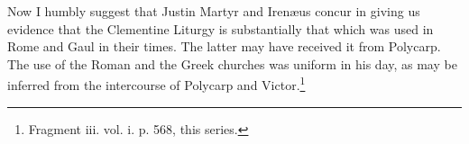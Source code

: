 Now I humbly suggest that Justin Martyr and Irenæus concur in giving us evidence that the Clementine Liturgy is substantially that which was used in Rome and Gaul in their times. The latter may have received it from Polycarp. The use of the Roman and the Greek churches was uniform in his day, as may be inferred from the intercourse of Polycarp and Victor.\footnote{\par  Fragment iii. vol. i. p. 568, this series.}
